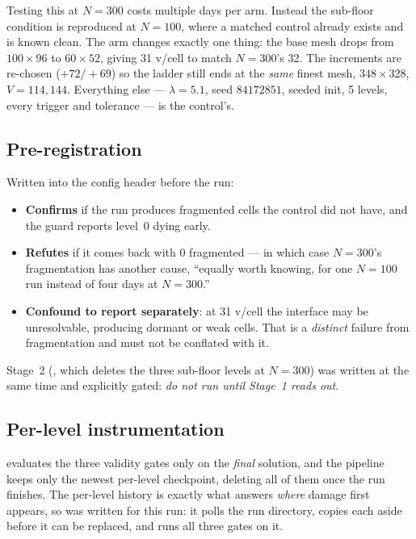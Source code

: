 \documentclass[11pt,a4paper]{article}
\begin{document}
Testing this at \(N{=}300\) costs multiple days per arm. Instead the sub-floor
condition is reproduced at \(N{=}100\), where a matched control already exists
and is known clean. The arm changes exactly one thing: the base mesh drops from
\(100{\times}96\) to \(60{\times}52\), giving 31 v/cell to match \(N{=}300\)'s 32.
The increments are re-chosen (\(+72/+69\)) so the ladder still ends at the
\emph{same} finest mesh, \(348{\times}328\), \(V{=}114{,}144\). Everything else
--- \(\lambda{=}5.1\), seed \(84172851\), seeded init, 5 levels, every trigger and
tolerance --- is the control's.

\subsection{Pre-registration}

Written into the config header before the run:

\begin{itemize}
  \item \textbf{Confirms} if the run produces fragmented cells the control did
    not have, and the guard reports level~0 dying early.
  \item \textbf{Refutes} if it comes back with 0 fragmented --- in which case
    \(N{=}300\)'s fragmentation has another cause, ``equally worth knowing, for
    one \(N{=}100\) run instead of four days at \(N{=}300\).''
  \item \textbf{Confound to report separately}: at 31 v/cell the interface may be
    unresolvable, producing dormant or weak cells. That is a \emph{distinct}
    failure from fragmentation and must not be conflated with it.
\end{itemize}

Stage~2 (, which
deletes the three sub-floor levels at \(N{=}300\)) was written at the same time
and explicitly gated: \emph{do not run until Stage~1 reads out}.

\subsection{Per-level instrumentation}

 evaluates the three validity gates only on the
\emph{final} solution, and the pipeline keeps only the newest per-level
checkpoint, deleting all of them once the run finishes. The per-level history is
exactly what answers \emph{where} damage first appears, so
 was written for this run: it polls the
run directory, copies each  aside before it can be
replaced, and runs all three gates on it.
\end{document}
